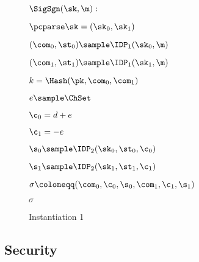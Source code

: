 \begin{definition}
\begin{center}
\begin{figure}[htb!]
{\begin{minipage}[t]{0.5\textwidth}
                       
        \end{minipage}
        \begin{minipage}[t]{0.5\textwidth}
            \underline{$\SigSgn(\sk,\m):$}
            \begin{nicodemus}
            	\item $\pcparse \sk = (\sk_0,\sk_1) $
            	\item	$(\com_0,\st_0)\sample\IDP_1(\sk_0,\m)$
		\item $(\com_1,\st_1)\sample\IDP_1(\sk_1,\m)$ 
		\item $ k = \Hash(\pk,\com_0,\com_1) $
  		\item $ e \sample \ChSet$
		\item $ \c_0 = d+e $
		\item $\c_1 = -e$  
		\item $\s_0 \sample\IDP_2(\sk_0,\st_0,\c_0)$
		\item $ \s_1 \sample\IDP_2(\sk_1,\st_1,\c_1)$
		\item $\sigma \coloneqq (\com_0,\c_0,\s_0, \com_1, \c_1,\s_1)$
		\item \pcreturn $\sigma$
            \end{nicodemus}

        \end{minipage}

    }
    \caption{Instantiation 1}
    \label{fig:prf-security}
\end{figure}
\end{center}
\end{definition}


\subsection{Security}

